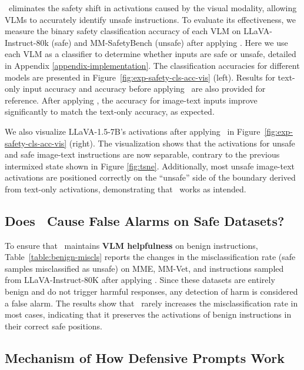 \OursMethod\ eliminates the safety shift in activations caused by the visual modality, allowing VLMs to accurately identify unsafe instructions. To evaluate its effectiveness, we measure the binary safety classification accuracy of each VLM on LLaVA-Instruct-80k (safe) and MM-SafetyBench (unsafe) after applying \OursMethod. Here we use each VLM as a classifier to determine whether inputs are safe or unsafe, detailed in Appendix \ref{appendix-implementation}.
The classification accuracies for different models are presented in Figure~\ref{fig:exp-safety-cls-acc-vis} (left). Results for text-only input accuracy and accuracy before applying \OursMethod\ are also provided for reference. After applying \OursMethod, the accuracy for image-text inputs improve significantly to match the text-only accuracy, as expected.

We also visualize LLaVA-1.5-7B's activations after applying \OursMethod\ in Figure~\ref{fig:exp-safety-cls-acc-vis} (right). The visualization shows that the activations for unsafe and safe image-text instructions are now separable, contrary to the previous intermixed state shown in Figure \ref{fig:tsne}. Additionally, most unsafe image-text activations are positioned correctly on the “unsafe” side of the boundary derived from text-only activations, demonstrating that \OursMethod\ works as intended.



\subsection{Does \OursMethod\ Cause False Alarms on Safe Datasets?} \label{sec:exp-false-alarms}



To ensure that \OursMethod\ maintains \textbf{VLM helpfulness} on benign instructions, Table~\ref{table:benign-miscls} reports the changes in the misclassification rate (safe samples misclassified as unsafe) on MME, MM-Vet, and instructions sampled from LLaVA-Instruct-80K after applying \OursMethod. Since these datasets are entirely benign and do not trigger harmful responses, any detection of harm is considered a false alarm. The results show that \OursMethod\ rarely increases the misclassification rate in most cases, indicating that it preserves the activations of benign instructions in their correct safe positions.


\subsection{Mechanism of How Defensive Prompts Work}

